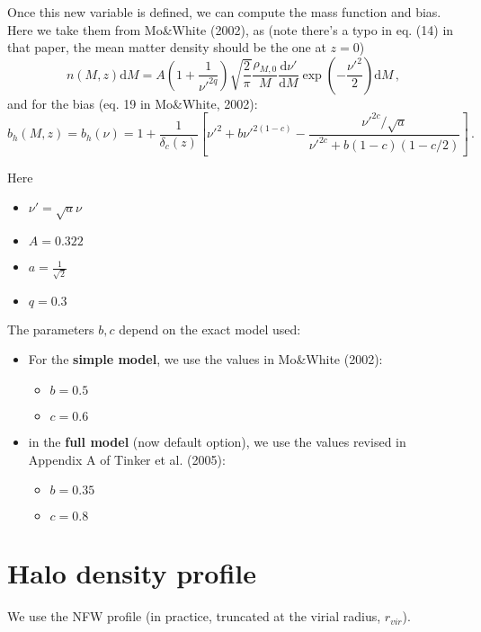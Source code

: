 \documentclass[10pt,a4paper]{article}
\begin{document}
Once this new variable is defined, we can compute the mass function and bias. Here we take them from Mo\&White (2002), as
(note there's a typo in eq. (14) in that paper, the mean matter density should be the one at $z=0$)
\begin{equation}
n(M,z)\mathrm{d}M = A \left(1 + \frac{1}{\nu'^{2q}}\right) \sqrt{\frac{2}{\pi}} \frac{\rho_{M,0}}{M} \frac{\mathrm{d}\nu'}{\mathrm{d}M} \exp\left(-\frac{\nu'^2}{2}\right)\mathrm{d}M \, ,
\end{equation}
and for the bias (eq. 19 in Mo\&White, 2002):
\begin{equation}
b_h(M,z) = b_h(\nu) = 1 + \frac{1}{\delta_c(z)}\left[ \nu'^2 + b\nu'^{2(1-c)} - \frac{\nu'^{2c}/\sqrt{a}}{\nu'^{2c} + b(1-c)(1 -c/2)}\right] \, .
\end{equation}

Here
\begin{itemize}
\item $\nu' = \sqrt{a}\nu$
\item $A = 0.322$
\item $a = \frac{1}{\sqrt{2}}$
\item $q = 0.3$
\end{itemize}

The parameters $b, c$ depend on the exact model used:

\begin{itemize}
\item For the \textbf{simple model}, we use the values in Mo\&White (2002):
  \begin{itemize}
  \item $b = 0.5$
  \item $c = 0.6$
  \end{itemize}
\item in the \textbf{full model} (now default option),  we use the values revised in Appendix A of Tinker et al. (2005):
  \begin{itemize}
  \item $b = 0.35$
  \item $c = 0.8$
  \end{itemize}
\end{itemize}


\section{Halo density profile}

We use the NFW profile (in practice, truncated at the virial radius, $r_{vir}$).
\end{document}
